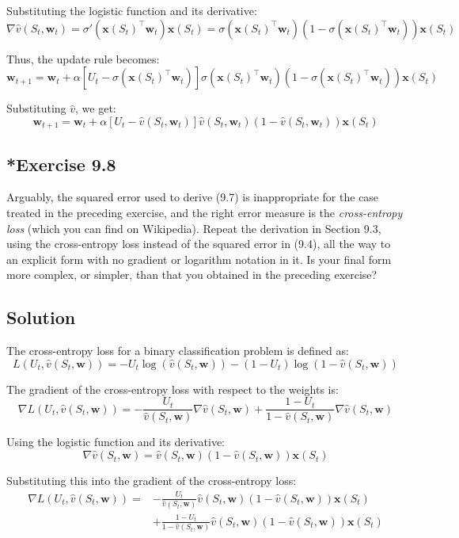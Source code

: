 Substituting the logistic function and its derivative:
\[
    \nabla \hat{v}(S_t, \mathbf{w}_t) = \sigma'(\mathbf{x}(S_t)^\top \mathbf{w}_t) \mathbf{x}(S_t) = \sigma(\mathbf{x}(S_t)^\top \mathbf{w}_t) (1 - \sigma(\mathbf{x}(S_t)^\top \mathbf{w}_t)) \mathbf{x}(S_t)
\]

Thus, the update rule becomes:
\[
    \mathbf{w}_{t+1} = \mathbf{w}_t + \alpha \left[ U_t - \sigma(\mathbf{x}(S_t)^\top \mathbf{w}_t) \right] \sigma(\mathbf{x}(S_t)^\top \mathbf{w}_t) (1 - \sigma(\mathbf{x}(S_t)^\top \mathbf{w}_t)) \mathbf{x}(S_t)
\]

Substituting $\hat{v}$, we get:
\[
    \mathbf{w}_{t+1} = \mathbf{w}_t + \alpha \left[ U_t - \hat{v}(S_t, \mathbf{w}_t) \right] \hat{v}(S_t, \mathbf{w}_t) (1 - \hat{v}(S_t, \mathbf{w}_t)) \mathbf{x}(S_t)
\]


\subsection*{*Exercise 9.8}
Arguably, the squared error used to derive (9.7) is inappropriate for the
case treated in the preceding exercise, and the right error measure is the \textit{cross-entropy
loss} (which you can find on Wikipedia). Repeat the derivation in Section 9.3, using the
cross-entropy loss instead of the squared error in (9.4), all the way to an explicit form
with no gradient or logarithm notation in it. Is your final form more complex, or simpler,
than that you obtained in the preceding exercise?

\subsection*{Solution}

The cross-entropy loss for a binary classification problem is defined as:
\[ 
    L(U_t, \hat{v}(S_t, \mathbf{w})) = - U_t \log(\hat{v}(S_t, \mathbf{w})) - (1 - U_t) \log(1 - \hat{v}(S_t, \mathbf{w}))
\]

The gradient of the cross-entropy loss with respect to the weights is:
\[ 
    \nabla L(U_t, \hat{v}(S_t, \mathbf{w})) = - \frac{U_t}{\hat{v}(S_t, \mathbf{w})} \nabla \hat{v}(S_t, \mathbf{w}) + \frac{1 - U_t}{1 - \hat{v}(S_t, \mathbf{w})} \nabla \hat{v}(S_t, \mathbf{w})
\]

Using the logistic function and its derivative:
\[ 
    \nabla \hat{v}(S_t, \mathbf{w}) = \hat{v}(S_t, \mathbf{w}) (1 - \hat{v}(S_t, \mathbf{w})) \mathbf{x}(S_t)
\]

Substituting this into the gradient of the cross-entropy loss:
\begin{align*} 
    \nabla L(U_t, \hat{v}(S_t, \mathbf{w})) = &- \frac{U_t}{\hat{v}(S_t, \mathbf{w})} \hat{v}(S_t, \mathbf{w}) (1 - \hat{v}(S_t, \mathbf{w})) \mathbf{x}(S_t) \\
    &+ \frac{1 - U_t}{1 - \hat{v}(S_t, \mathbf{w})} \hat{v}(S_t, \mathbf{w}) (1 - \hat{v}(S_t, \mathbf{w})) \mathbf{x}(S_t)
\end{align*}

